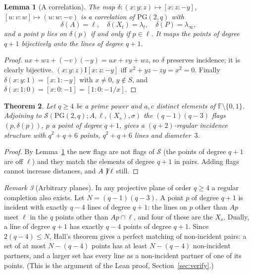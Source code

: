 \documentclass[11pt]{amsart}
\newtheorem{theorem}{Theorem}[section]
\newtheorem{lemma}[theorem]{Lemma}
\theoremstyle{definition}
\theoremstyle{remark}
\newtheorem{remark}[theorem]{Remark}
\newcommand{\cS}{\mathcal{S}}
\newcommand{\I}{\mathrel{\mathrm{I}}}
\newcommand{\nI}{\mathrel{\not\!\mathrm{I}}}
\newcommand{\PG}{\mathrm{PG}}
\newcommand{\F}{\mathbb{F}}
\newcommand{\pnt}[3]{({#1}{:}{#2}{:}{#3})}
\newcommand{\lin}[3]{[{#1}{:}{#2}{:}{#3}]}
\newcommand{\lam}{\lambda}
\begin{document}
\begin{lemma}[A correlation]\label{lem:corr}
The map $\delta\colon\pnt xyz\mapsto\lin xz{-y}$, $\lin uvw\mapsto\pnt uw{-v}$ is a correlation of $\PG(2,q)$ with
\[
\delta(A)=\ell,\quad \delta(X_t)=\lam_t,\quad \delta(P)=\lam_\infty,
\]
and a point $p$ lies on $\delta(p)$ if and only if $p\in\ell$. It maps the points of degree $q+1$ bijectively onto the lines of degree $q+1$.
\end{lemma}

\begin{proof}
$ux+wz+(-v)(-y)=ux+vy+wz$, so $\delta$ preserves incidence; it is clearly bijective. $\pnt xyz\I\lin xz{-y}$ iff $x^2+yz-zy=x^2=0$. Finally $\delta\pnt xy1=\lin x1{-y}$ with $x\ne0$, $y\notin S$, and $\delta\pnt x10=\lin x0{-1}=\lin10{-1/x}$.
\end{proof}

\begin{theorem}\label{thm:fourhat-regular}
Let $q\ge4$ be a prime power and $a,c$ distinct elements of $\F\setminus\{0,1\}$. Adjoining to $\cS(\PG(2,q);A,\ell,(X_s),\sigma)$ the $(q-1)(q-3)$ flags $(p,\delta(p))$, $p$ a point of degree $q+1$, gives a $(q+2)$-regular incidence structure with $q^2+q+6$ points, $q^2+q+6$ lines and diameter~$3$.
\end{theorem}

\begin{proof}
By Lemma~\ref{lem:corr} the new flags are not flags of $\cS$ (the points of degree $q+1$ are off $\ell$) and they match the elements of degree $q+1$ in pairs. Adding flags cannot increase distances, and $A\nI\ell$ still.
\end{proof}

\begin{remark}[Arbitrary planes]\label{rem:arbplanes}
In any projective plane of order $q\ge4$ a regular completion also exists. Let $N=(q-1)(q-3)$. A point $p$ of degree $q+1$ is incident with exactly $q-4$ lines of degree $q+1$: the lines on $p$ other than $Ap$ meet $\ell$ in the $q$ points other than $Ap\cap\ell$, and four of these are the $X_s$. Dually, a line of degree $q+1$ has exactly $q-4$ points of degree $q+1$. Since $2(q-4)\le N$, Hall's theorem gives a perfect matching of non-incident pairs: a set of at most $N-(q-4)$ points has at least $N-(q-4)$ non-incident partners, and a larger set has every line as a non-incident partner of one of its points. (This is the argument of the Lean proof, Section~\ref{sec:verify}.)
\end{remark}
\end{document}

